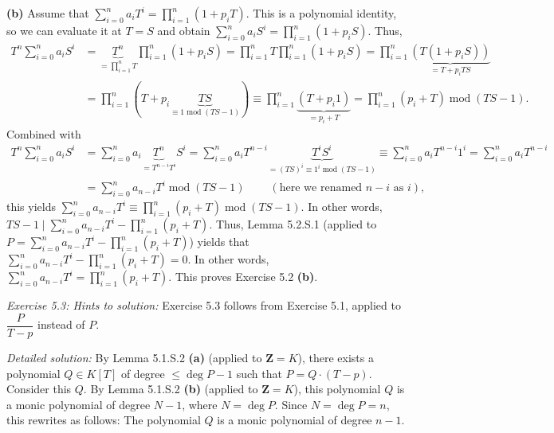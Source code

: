 \documentclass[numbers=enddot,12pt,final,onecolumn,notitlepage]{scrartcl}%
\begin{document}
\textbf{(b)} Assume that $\sum\limits_{i=0}^{n}a_{i}T^{i}=\prod\limits_{i=1}%
^{n}\left(  1+p_{i}T\right)  $. This is a polynomial identity, so we can
evaluate it at $T=S$ and obtain $\sum\limits_{i=0}^{n}a_{i}S^{i}%
=\prod\limits_{i=1}^{n}\left(  1+p_{i}S\right)  $. Thus,%
\begin{align*}
T^{n}\sum\limits_{i=0}^{n}a_{i}S^{i}  &  =\underbrace{T^{n}}_{=\prod
\limits_{i=1}^{n}T}\prod\limits_{i=1}^{n}\left(  1+p_{i}S\right)
=\prod\limits_{i=1}^{n}T\prod\limits_{i=1}^{n}\left(  1+p_{i}S\right)
=\prod\limits_{i=1}^{n}\underbrace{\left(  T\left(  1+p_{i}S\right)  \right)
}_{=T+p_{i}TS}\\
&  =\prod\limits_{i=1}^{n}\left(  T+p_{i}\underbrace{TS}_{\equiv
1\operatorname{mod}\left(  TS-1\right)  }\right)  \equiv\prod\limits_{i=1}%
^{n}\underbrace{\left(  T+p_{i}1\right)  }_{=p_{i}+T}=\prod\limits_{i=1}%
^{n}\left(  p_{i}+T\right)  \operatorname{mod}\left(  TS-1\right)  .
\end{align*}
Combined with%
\begin{align*}
T^{n}\sum\limits_{i=0}^{n}a_{i}S^{i}  &  =\sum\limits_{i=0}^{n}a_{i}%
\underbrace{T^{n}}_{=T^{n-i}T^{i}}S^{i}=\sum\limits_{i=0}^{n}a_{i}%
T^{n-i}\underbrace{T^{i}S^{i}}_{=\left(  TS\right)  ^{i}\equiv1^{i}%
\operatorname{mod}\left(  TS-1\right)  }\equiv\sum\limits_{i=0}^{n}%
a_{i}T^{n-i}1^{i}=\sum\limits_{i=0}^{n}a_{i}T^{n-i}\\
&  =\sum\limits_{i=0}^{n}a_{n-i}T^{i}\operatorname{mod}\left(  TS-1\right)
\ \ \ \ \ \ \ \ \ \ \left(  \text{here we renamed }n-i\text{ as }i\right)  ,
\end{align*}
this yields $\sum\limits_{i=0}^{n}a_{n-i}T^{i}\equiv\prod\limits_{i=1}%
^{n}\left(  p_{i}+T\right)  \operatorname{mod}\left(  TS-1\right)  $. In other
words, $TS-1\mid\sum\limits_{i=0}^{n}a_{n-i}T^{i}-\prod\limits_{i=1}%
^{n}\left(  p_{i}+T\right)  $. Thus, Lemma 5.2.S.1 (applied to $P=\sum
\limits_{i=0}^{n}a_{n-i}T^{i}-\prod\limits_{i=1}^{n}\left(  p_{i}+T\right)  $)
yields that $\sum\limits_{i=0}^{n}a_{n-i}T^{i}-\prod\limits_{i=1}^{n}\left(
p_{i}+T\right)  =0$. In other words, $\sum\limits_{i=0}^{n}a_{n-i}T^{i}%
=\prod\limits_{i=1}^{n}\left(  p_{i}+T\right)  $. This proves Exercise 5.2
\textbf{(b)}.

\textit{Exercise 5.3: Hints to solution:} Exercise 5.3 follows from Exercise
5.1, applied to $\dfrac{P}{T-p}$ instead of $P$.

\textit{Detailed solution:} By Lemma 5.1.S.2 \textbf{(a)} (applied to
$\mathbf{Z}=K$), there exists a polynomial $Q\in K\left[  T\right]  $ of
degree $\leq\deg P-1$ such that $P=Q\cdot\left(  T-p\right)  $. Consider this
$Q$. By Lemma 5.1.S.2 \textbf{(b)} (applied to $\mathbf{Z}=K$), this
polynomial $Q$ is a monic polynomial of degree $N-1$, where $N=\deg P$. Since
$N=\deg P=n$, this rewrites as follows: The polynomial $Q$ is a monic
polynomial of degree $n-1$.
\end{document}

